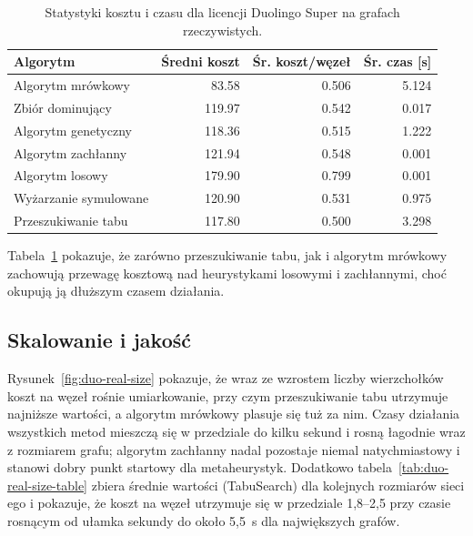 \begin{table}[H]
  \centering
  \caption{Statystyki kosztu i czasu dla licencji Duolingo Super na grafach rzeczywistych.}
  \label{tab:duo-real-alg}
  \begin{tabular}{lrrr}
    \toprule
    \textbf{Algorytm}     & \textbf{Średni koszt} & \textbf{Śr. koszt/węzeł} & \textbf{Śr. czas [s]} \\
    \midrule
    Algorytm mrówkowy     & 83.58                 & 0.506                    & 5.124                 \\
    Zbiór dominujący      & 119.97                & 0.542                    & 0.017                 \\
    Algorytm genetyczny   & 118.36                & 0.515                    & 1.222                 \\
    Algorytm zachłanny    & 121.94                & 0.548                    & 0.001                 \\
    Algorytm losowy       & 179.90                & 0.799                    & 0.001                 \\
    Wyżarzanie symulowane & 120.90                & 0.531                    & 0.975                 \\
    Przeszukiwanie tabu   & 117.80                & 0.500                    & 3.298                 \\
    \bottomrule
  \end{tabular}
\end{table}
Tabela~\ref{tab:duo-real-alg} pokazuje, że zarówno przeszukiwanie tabu, jak i algorytm mrówkowy zachowują przewagę kosztową nad heurystykami losowymi i zachłannymi, choć okupują ją dłuższym czasem działania.

\subsection{Skalowanie i jakość}

Rysunek~\ref{fig:duo-real-size} pokazuje, że wraz ze wzrostem liczby wierzchołków koszt na węzeł rośnie umiarkowanie, przy czym przeszukiwanie tabu utrzymuje najniższe wartości, a algorytm mrówkowy plasuje się tuż za nim. Czasy działania wszystkich metod mieszczą się w przedziale do kilku sekund i rosną łagodnie wraz z rozmiarem grafu; algorytm zachłanny nadal pozostaje niemal natychmiastowy i stanowi dobry punkt startowy dla metaheurystyk. Dodatkowo tabela~\ref{tab:duo-real-size-table} zbiera średnie wartości (TabuSearch) dla kolejnych rozmiarów sieci ego i pokazuje, że koszt na węzeł utrzymuje się w przedziale 1{,}8--2{,}5 przy czasie rosnącym od ułamka sekundy do około 5{,}5~s dla największych grafów.


